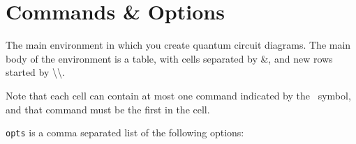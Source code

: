 \documentclass[aps,pra,10pt,nofootinbib]{revtex4-2}
\begin{document}

\newpage
\section{Commands \& Options}
\reversemarginpar

\begin{description}[style=nextline]
  \item [\textbackslash begin\{quantikz\}{[opts]}\ldots\textbackslash end\{quantikz\}]
        The main environment in which you create quantum circuit diagrams. The main body of the environment is a table, with cells separated by \&, and new rows started by \textbackslash\textbackslash.

        Note that each cell can contain at most one command indicated by the \faToggleOn\ symbol, and that command must be the first in the cell.

        \texttt{opts} is a comma separated list of the following options:


\end{description}
\end{document}
